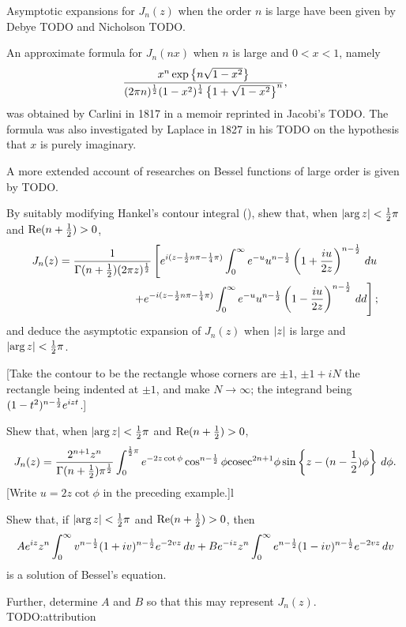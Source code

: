 \documentclass{book}
\begin{document}
  Asymptotic expansions for $J_n(z)$ when the order $n$ is large have
  been given by Debye TODO and Nicholson TODO.

  An approximate formula for $J_n(nx)$ when $n$ is large and $0<x<1$,
  namely
  $$
  \frac{ x^n \exp\left\{ n \sqrt{1-x^2} \right\}}{ (2\pi n)^{\frac{1}{2}} (1-x^2)^{\frac{1}{4}} \left\{ 1 +
      \sqrt{1 - x^2} \right\}^n},
  $$
  was obtained by Carlini in 1817 in a memoir reprinted in Jacobi's
  TODO.
  The formula was also investigated by Laplace in 1827 in his TODO on
  the hypothesis that $x$ is purely imaginary.

  A more extended account of researches on Bessel functions of large
  order is given by TODO.
  \begin{wandwexample}
    By suitably modifying Hankel's contour integral
    (), shew that, when
    $\left| \arg z \right| < \frac{1}{2} \pi$ and
    $\mathrm{Re}(n+\frac{1}{2}) > 0$,
    \begin{align*}
      J_n(z)
      =
      \frac{1}{\Gamma(n+\frac{1}{2}) (2\pi z)^{\frac{1}{2}}}
      \left[
        e^{i(z - \frac{1}{2} n \pi - \frac{1}{4} \pi)}
        \int_0^{\infty}
        e^{-u}
        u^{n-\frac{1}{2}}
        \left( 1 + \frac{iu}{2z} \right)^{n-\frac{1}{2}}
        \, d u
      \right.
      \\
      \left.
        +
        e^{-i(z - \frac{1}{2} n \pi - \frac{1}{4}\pi)}
        \int_0^{\infty}
        e^{-u}
        u^{n-\frac{1}{2}}
        \left( 1 - \frac{iu}{2z} \right)^{n-\frac{1}{2}}
        \, d d
        \right];
      \end{align*}
      and deduce the asymptotic expansion of $J_n(z)$ when
      $\left| z \right|$ is large and
      $\left| \arg z \right| < \frac{1}{2} \pi$.

      [Take the contour to be the rectangle whose corners are
      $\pm 1$, $\pm 1 + iN$ the rectangle being indented at $\pm 1$,
      and make $N \rightarrow \infty$; the integrand being
      $(1-t^2)^{n-\frac{1}{2}} e^{izt}$.]
    \end{wandwexample}
    \begin{wandwexample}
      Shew that, when $\left| \arg z \right| < \frac{1}{2} \pi$ and
      $\mathrm{Re}(n+\frac{1}{2}) > 0$,
      $$
      J_n(z)
      =
      \frac{2^{n+1} z^n}{\Gamma(n+\frac{1}{2}) \pi^{\frac{1}{2}}}
      \int_0^{\frac{1}{2}\pi}
      e^{-2z\cot\phi}
      \cos^{n-\frac{1}{2}}\phi
      \mathrm{cosec}^{2n+1}\phi
      \sin\left\{ z - (n-\frac{1}{2})\phi \right\}
      \, d \phi.
      $$
      [Write $u = 2z\cot\phi$ in the preceding example.]l
    \end{wandwexample}
    \begin{wandwexample}
      Shew that, if $\left| \arg z \right| < \frac{1}{2} \pi$ and
      $\mathrm{Re}(n+\frac{1}{2}) > 0$, then
      $$
      A e^{iz} z^n
      \int_0^{\infty}
      v^{n-\frac{1}{2}}
      (1+iv)^{n-\frac{1}{2}}
      e^{-2vz}
      \, d v
      +
      B e^{-iz} z^n
      \int_0^{\infty}
      e^{n-\frac{1}{2}}
      (1-iv)^{n-\frac{1}{2}}
      e^{-2vz}
      \, d v
      $$
      is a solution of Bessel's equation.

      Further, determine $A$ and $B$ so that this may represent
      $J_n(z)$.
      TODO:attribution
    \end{wandwexample}
\end{document}
